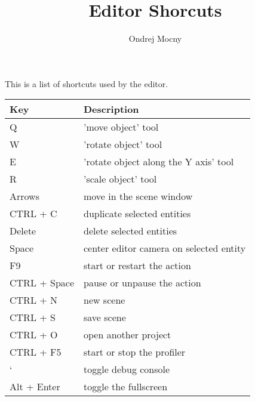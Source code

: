 \documentclass[a4paper, 12pt]{report}
\begin{document}
\pagestyle{empty} %

\title{Editor Shorcuts}
\author{Ondrej Mocny}

\pagestyle{plain} %

This is a list of shortcuts used by the editor.

\begin{tabular}{|p{0.20\hsize}|p{0.7\hsize}|}
  \hline
  Key & Description \\
	\hline
	Q & 'move object' tool \\
	W & 'rotate object' tool \\
	E & 'rotate object along the Y axis' tool \\
	R & 'scale object' tool \\
	\hline
	Arrows & move in the scene window \\
	CTRL + C & duplicate selected entities \\
	Delete & delete selected entities \\
	Space & center editor camera on selected entity \\
	F9 & start or restart the action \\
	CTRL + Space & pause or unpause the action \\
	\hline
	CTRL + N & new scene \\
	CTRL + S & save scene \\
	CTRL + O & open another project \\
	\hline
	CTRL + F5 & start or stop the profiler \\
	` & toggle debug console \\
	Alt + Enter & toggle the fullscreen \\
	\hline
\end{tabular}
\end{document}
